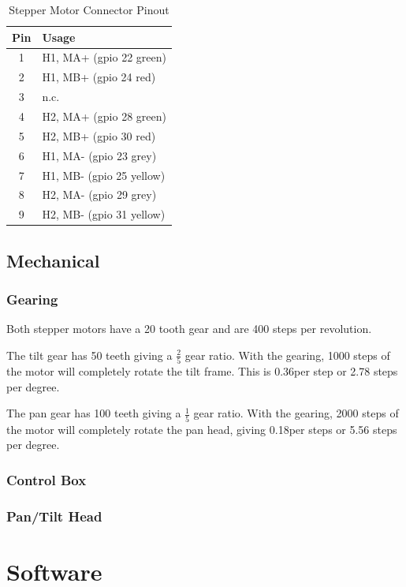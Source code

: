 \documentclass[10pt, openany]{book}
\begin{document}
\begin{table}
  \begin{center}
    \caption{Stepper Motor Connector Pinout}
    \label{tbl:Stepper}
    \begin{tabular}[htb]{|c|l|}
      \hline
      Pin & Usage \\
      \hline
      1 & H1, MA+ (gpio 22 green) \\
      2 & H1, MB+ (gpio 24 red) \\
      3 & n.c. \\
      4 & H2, MA+ (gpio 28 green) \\
      5 & H2, MB+ (gpio 30 red) \\
      6 & H1, MA- (gpio 23 grey) \\
      7 & H1, MB- (gpio 25 yellow) \\
      8 & H2, MA- (gpio 29 grey) \\
      9 & H2, MB- (gpio 31 yellow) \\
      \hline
    \end{tabular}
  \end{center}
\end{table}

\section{Mechanical}
\subsection{Gearing}
Both stepper motors have a 20 tooth gear and are 400 steps per revolution.

The tilt gear has 50 teeth giving a $\frac{2}{5}$ gear ratio.  With the gearing, 1000 steps of the motor will completely rotate the tilt frame.  This is 0.36\degree per step or 2.78 steps per degree.

The pan gear has 100 teeth giving a $\frac{1}{5}$ gear ratio.  With the gearing, 2000 steps of the motor will completely rotate the pan head, giving 0.18\degree per steps or 5.56 steps per degree.

\subsection{Control Box}

\subsection{Pan/Tilt Head}

\chapter{Software}
\end{document}
